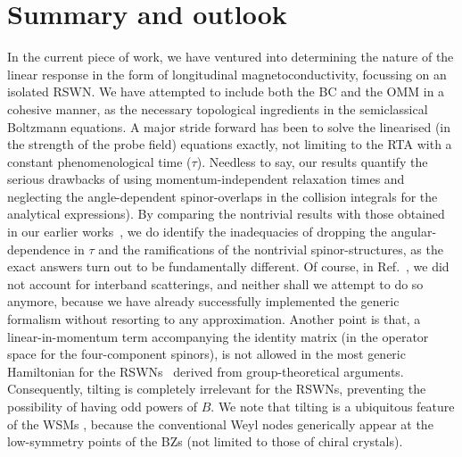 \documentclass[aps,prb,onecolumn,nofootinbib,citeautoscript,10pt, showkeys]{revtex4-2}
\begin{document}
\section{Summary and outlook}
\label{secsum}

In the current piece of work, we have ventured into determining the nature of the linear response in the form of longitudinal magnetoconductivity, focussing on an isolated RSWN. We have attempted to include both the BC and the OMM in a cohesive manner, as the necessary topological ingredients in the semiclassical Boltzmann equations. A major stride forward  has been to solve the linearised (in the strength of the probe field) equations exactly, not limiting to the RTA with a constant phenomenological time ($\tau$). Needless to say, our results quantify the serious drawbacks of using momentum-independent relaxation times and neglecting the angle-dependent spinor-overlaps in the collision integrals for the analytical expressions). By comparing the nontrivial results with those obtained in our earlier works~\cite{ips-rsw-ph, ips-internode}, we do identify the inadequacies of dropping the angular-dependence in $\tau$ and the ramifications of the nontrivial spinor-structures, as the exact answers turn out to be fundamentally different.
Of course, in Ref.~\cite{ips-rsw-ph}, we did not account for interband scatterings, and neither shall we attempt to do so anymore, because we have already successfully implemented the generic formalism without resorting to any approximation. Another point is that, a linear-in-momentum term accompanying the identity matrix (in the operator space for the four-component spinors), is not allowed in the most generic Hamiltonian for the RSWNs~\cite{xu2020_optical} derived from group-theoretical arguments. Consequently, tilting is completely irrelevant for the RSWNs, preventing the possibility of having odd powers of $B$. We note that tilting is a ubiquitous feature of the WSMs \cite{staalhammar20_magneto, yadav23_magneto, rahul-jpcm, ips-ruiz, ips-tilted}, because the conventional Weyl nodes generically appear at the low-symmetry points of the BZs (not limited to those of chiral crystals). 
\end{document}
